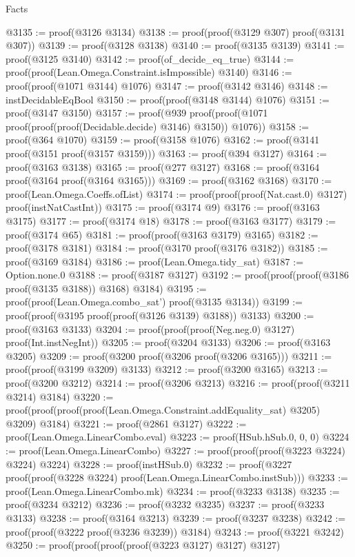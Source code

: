 \begin{lexlean}{Facts}
\begin{coremodule}
@3135 := proof(@3126 @3134)
@3138 := proof(proof(@3129 @307) proof(@3131 @307))
@3139 := proof(@3128 @3138)
@3140 := proof(@3135 @3139)
@3141 := proof(@3125 @3140)
@3142 := proof(of_decide_eq_true)
@3144 := proof(proof(Lean.Omega.Constraint.isImpossible) @3140)
@3146 := proof(proof(@1071 @3144) @1076)
@3147 := proof(@3142 @3146)
@3148 := instDecidableEqBool
@3150 := proof(proof(@3148 @3144) @1076)
@3151 := proof(@3147 @3150)
@3157 := proof(@939 proof(proof(@1071 proof(proof(proof(Decidable.decide) @3146) @3150)) @1076))
@3158 := proof(@364 @1070)
@3159 := proof(@3158 @1076)
@3162 := proof(@3141 proof(@3151 proof(@3157 @3159)))
@3163 := proof(@394 @3127)
@3164 := proof(@3163 @3138)
@3165 := proof(@277 @3127)
@3168 := proof(@3164 proof(@3164 proof(@3164 @3165)))
@3169 := proof(@3162 @3168)
@3170 := proof(Lean.Omega.Coeffs.ofList)
@3174 := proof(proof(proof(Nat.cast.{0}) @3127) proof(instNatCastInt))
@3175 := proof(@3174 @9)
@3176 := proof(@3163 @3175)
@3177 := proof(@3174 @18)
@3178 := proof(@3163 @3177)
@3179 := proof(@3174 @65)
@3181 := proof(proof(@3163 @3179) @3165)
@3182 := proof(@3178 @3181)
@3184 := proof(@3170 proof(@3176 @3182))
@3185 := proof(@3169 @3184)
@3186 := proof(Lean.Omega.tidy_sat)
@3187 := Option.none.{0}
@3188 := proof(@3187 @3127)
@3192 := proof(proof(proof(@3186 proof(@3135 @3188)) @3168) @3184)
@3195 := proof(proof(Lean.Omega.combo_sat') proof(@3135 @3134))
@3199 := proof(proof(@3195 proof(proof(@3126 @3139) @3188)) @3133)
@3200 := proof(@3163 @3133)
@3204 := proof(proof(proof(Neg.neg.{0}) @3127) proof(Int.instNegInt))
@3205 := proof(@3204 @3133)
@3206 := proof(@3163 @3205)
@3209 := proof(@3200 proof(@3206 proof(@3206 @3165)))
@3211 := proof(proof(@3199 @3209) @3133)
@3212 := proof(@3200 @3165)
@3213 := proof(@3200 @3212)
@3214 := proof(@3206 @3213)
@3216 := proof(proof(@3211 @3214) @3184)
@3220 := proof(proof(proof(proof(Lean.Omega.Constraint.addEquality_sat) @3205) @3209) @3184)
@3221 := proof(@2861 @3127)
@3222 := proof(Lean.Omega.LinearCombo.eval)
@3223 := proof(HSub.hSub.{0, 0, 0})
@3224 := proof(Lean.Omega.LinearCombo)
@3227 := proof(proof(proof(@3223 @3224) @3224) @3224)
@3228 := proof(instHSub.{0})
@3232 := proof(@3227 proof(proof(@3228 @3224) proof(Lean.Omega.LinearCombo.instSub)))
@3233 := proof(Lean.Omega.LinearCombo.mk)
@3234 := proof(@3233 @3138)
@3235 := proof(@3234 @3212)
@3236 := proof(@3232 @3235)
@3237 := proof(@3233 @3133)
@3238 := proof(@3164 @3213)
@3239 := proof(@3237 @3238)
@3242 := proof(proof(@3222 proof(@3236 @3239)) @3184)
@3243 := proof(@3221 @3242)
@3250 := proof(proof(proof(proof(@3223 @3127) @3127) @3127)

\end{coremodule}
\end{lexlean}
